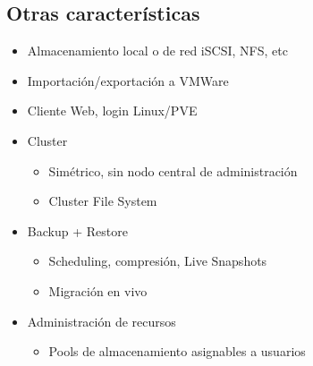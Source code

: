 \subsection{Otras características}
	\begin{itemize}
	\item Almacenamiento local o de red iSCSI, NFS, etc
		\item 	Importación/exportación a VMWare
		\item Cliente Web, login Linux/PVE
		\item Cluster
\begin{itemize}
 		\item  	Simétrico, sin nodo central de administración 
		\item Cluster File System

 	\end{itemize}		\item Backup + Restore
		\begin{itemize}
		 		\item  	Scheduling, compresión, Live Snapshots
	\item Migración en vivo
		 	\end{itemize}
	\item Administración de recursos
\begin{itemize}
 	\item  Pools de almacenamiento asignables a usuarios
 \end{itemize}
	\end{itemize}


